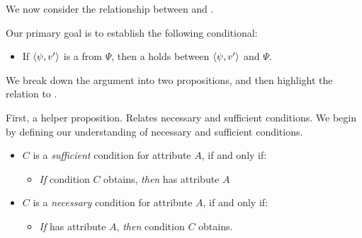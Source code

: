\begin{note}
  We now consider the relationship between  and .

  Our primary goal is to establish the following conditional:

  \begin{itemize}
  \item
    If \(\langle \psi, v' \rangle\) is a \fc{} from \(\Psi\), then a \ros{} holds between \(\langle \psi, v' \rangle\) and \(\Psi\).
  \end{itemize}

  \noindent%
  We break down the argument into two propositions, and then highlight the relation to \issueConstraint{}.
\end{note}

\begin{note}
  First, a helper proposition.
  Relates necessary and sufficient conditions.
  We begin by defining our understanding of necessary and sufficient conditions.

  \begin{definition}
    \label{def:NScon}

    \begin{itemize}
    \item
      \(C\) is a \emph{sufficient} condition for attribute \(A\), if and only if:
      \begin{itemize}
      \item
        \emph{If} condition \(C\) obtains, \emph{then} \vAgent{} has attribute \(A\)
      \end{itemize}
    \item
      \(C\) is a \emph{necessary} condition for attribute \(A\), if and only if:
      \begin{itemize}
      \item
        \emph{If} \vAgent{} has attribute \(A\), \emph{then} condition \(C\) obtains.
      \end{itemize}
    \end{itemize}
    \vspace{-\baselineskip}
  \end{definition}


\end{note}
